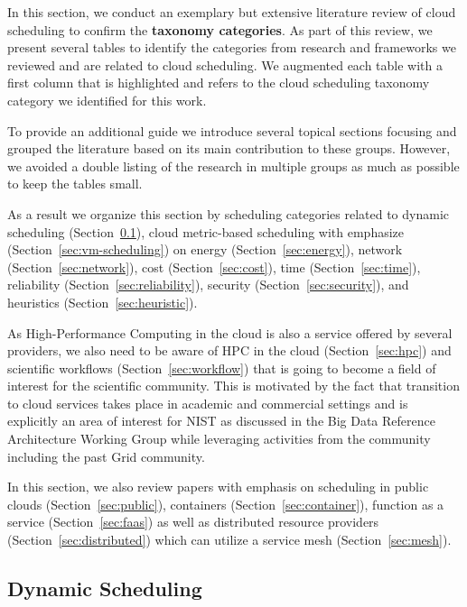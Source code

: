 \documentclass[final,5p,times,twocolumn]{elsarticle}
\begin{document}
In this section, we conduct an exemplary but extensive literature
review of cloud scheduling to confirm the {\bf taxonomy
 categories}. As part of this review, we present several tables to identify the categories from research and frameworks we reviewed and are related to cloud scheduling. We augmented each table with a first column that is highlighted and refers to the cloud scheduling taxonomy category we identified for this work.

To provide an additional guide we introduce several topical sections focusing and grouped the literature based on its main contribution to these groups. However, we avoided a double listing of the research in multiple groups as much as possible to keep the tables small.

As a result we organize this section by scheduling categories related to 
%
dynamic scheduling (Section~\ref{sec:dynamic}),
cloud metric-based scheduling with emphasize (Section~\ref{sec:vm-scheduling}) on 
energy (Section~\ref{sec:energy}),
network (Section~\ref{sec:network}),
cost (Section~\ref{sec:cost}),
time (Section~\ref{sec:time}),
reliability (Section~\ref{sec:reliability}),
security (Section~\ref{sec:security}), 
and heuristics (Section~\ref{sec:heuristic}).

As High-Performance Computing in the cloud is also a service offered by several providers, we also need to be aware of HPC in the cloud (Section~\ref{sec:hpc}) and scientific workflows (Section~\ref{sec:workflow}) that is going to become a field of interest for the scientific community. This is motivated by the fact that transition to cloud services takes place in academic and commercial settings and is explicitly an area of interest for NIST as discussed in the Big Data Reference Architecture Working Group while leveraging activities from the community including the past Grid community.

In this section, we also review papers with emphasis on scheduling in public clouds (Section~\ref{sec:public}), containers (Section~\ref{sec:container}), function as a service (Section~\ref{sec:faas}) as well as distributed resource providers (Section~\ref{sec:distributed}) which can utilize a service mesh (Section~\ref{sec:mesh}).





\subsection{Dynamic Scheduling}\label{sec:dynamic}
\end{document}
